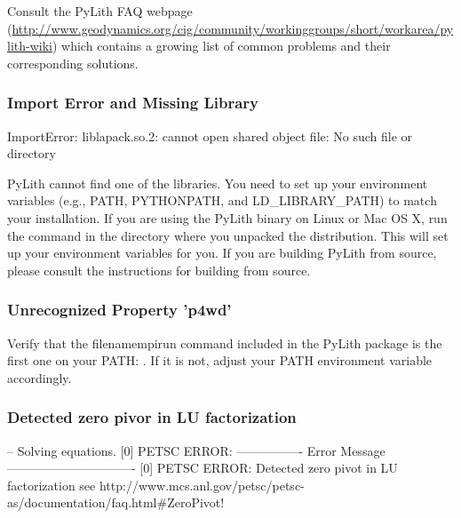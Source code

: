 Consult the PyLith FAQ webpage (\url{http://www.geodynamics.org/cig/community/workinggroups/short/workarea/pylith-wiki})
which contains a growing list of common problems and their corresponding
solutions.

\subsubsection{Import Error and Missing Library}
\begin{shell}
ImportError: liblapack.so.2: cannot open shared object file: No such file or directory
\end{shell}

PyLith cannot find one of the libraries. You need to set up your environment
variables (e.g., PATH, PYTHONPATH, and LD\_LIBRARY\_PATH) to match
your installation. If you are using the PyLith binary on Linux or
Mac OS X, run the command in the directory
where you unpacked the distribution. This will set up your environment
variables for you. If you are building PyLith from source, please
consult the instructions for building from source.

\subsubsection{Unrecognized Property 'p4wd'}

\begin{shell}
-- pyre.inventory(error) } \\
-- p4wd <- 'true' } \\
-- unrecognized property 'p4wd' } \\
>> \{command line\}:: } \\
-{}- pyre.inventory(error) } \\
-{}- p4pg <- 'true' } \\
-{}- unrecognized property ' p4pg'}
\end{shell}
Verify that the filename{mpirun} command included in the PyLith package is
the first one on your PATH: . If it is not, adjust your PATH environment variable accordingly.

\subsubsection{Detected zero pivor in LU factorization}

\begin{shell}
-- Solving equations.
[0] PETSC ERROR: ----------------
Error Message -------------------------------
[0] PETSC ERROR: Detected zero pivot in LU factorization
see http://www.mcs.anl.gov/petsc/petsc-as/documentation/faq.html\#ZeroPivot!
\end{shell}

